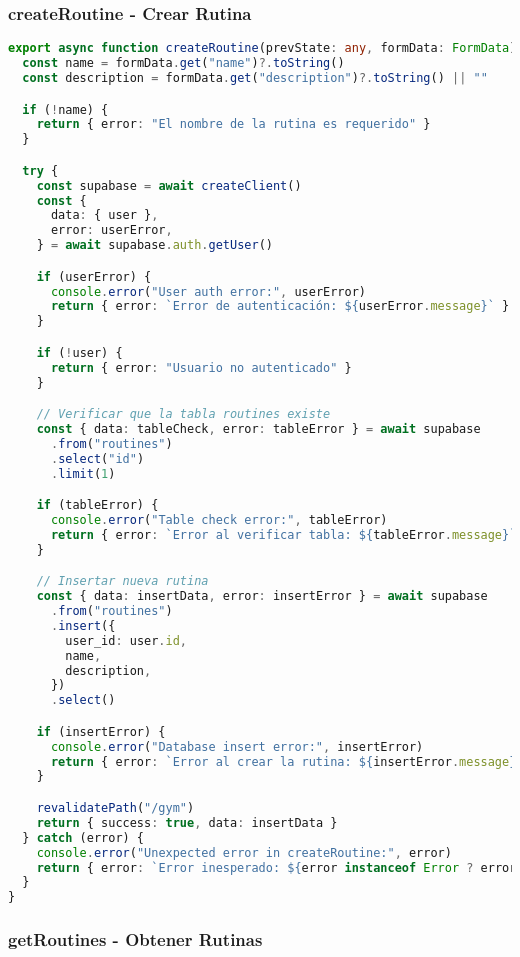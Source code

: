 \documentclass[12pt,a4paper]{article}
\begin{document}
\subsubsection{createRoutine - Crear Rutina}

\begin{lstlisting}[language=typescript, caption=Función createRoutine completa]
export async function createRoutine(prevState: any, formData: FormData) {
  const name = formData.get("name")?.toString()
  const description = formData.get("description")?.toString() || ""

  if (!name) {
    return { error: "El nombre de la rutina es requerido" }
  }

  try {
    const supabase = await createClient()
    const {
      data: { user },
      error: userError,
    } = await supabase.auth.getUser()

    if (userError) {
      console.error("User auth error:", userError)
      return { error: `Error de autenticación: ${userError.message}` }
    }

    if (!user) {
      return { error: "Usuario no autenticado" }
    }

    // Verificar que la tabla routines existe
    const { data: tableCheck, error: tableError } = await supabase
      .from("routines")
      .select("id")
      .limit(1)

    if (tableError) {
      console.error("Table check error:", tableError)
      return { error: `Error al verificar tabla: ${tableError.message}` }
    }

    // Insertar nueva rutina
    const { data: insertData, error: insertError } = await supabase
      .from("routines")
      .insert({
        user_id: user.id,
        name,
        description,
      })
      .select()

    if (insertError) {
      console.error("Database insert error:", insertError)
      return { error: `Error al crear la rutina: ${insertError.message}` }
    }

    revalidatePath("/gym")
    return { success: true, data: insertData }
  } catch (error) {
    console.error("Unexpected error in createRoutine:", error)
    return { error: `Error inesperado: ${error instanceof Error ? error.message : String(error)}` }
  }
}
\end{lstlisting}

\subsubsection{getRoutines - Obtener Rutinas}
\end{document}
